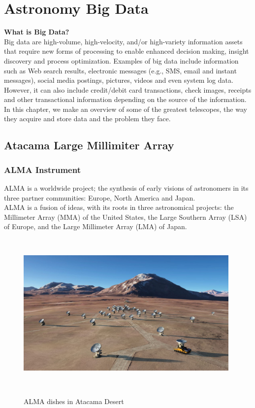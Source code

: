 \chapter{Astronomy Big Data}


\textbf{What is Big Data?} \\

Big data are high-volume, high-velocity, and/or high-variety information assets that require new forms of processing to enable enhanced decision making, insight discovery and process optimization. Examples of big data include information such as Web search results, electronic messages (e.g., SMS, email and instant messages), social media postings, pictures, videos and even system log data.  However, it can also include credit/debit card transactions, check images, receipts and other transactional information depending on the source of the information. \\



In this chapter, we make an overview of some of the greatest telescopes, the way they acquire and store data and the problem they face.


\section{Atacama Large Millimiter Array}

\subsection{ALMA Instrument}

ALMA is a worldwide project; the synthesis of early visions of astronomers in its three partner communities: Europe, North America and Japan.\\

ALMA is a fusion of ideas, with its roots in three astronomical projects: the Millimeter Array (MMA) of the United States, the Large Southern Array (LSA) of Europe, and the Large Millimeter Array (LMA) of Japan.\\

\begin{figure}
\centering
\includegraphics[width=11cm,height=8cm]{images/alma.jpg}\\
\caption{ALMA dishes in Atacama Desert}
\end{figure}


